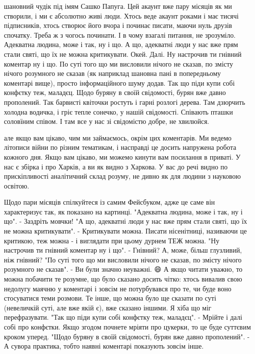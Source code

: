 шановний чудік під імям Сашко Папуга. Цей акаунт вже пару місяців як ми
створили, і ми є абсолютно живі люди. Хтось веде акаунт роками і має тисячі
підписників, хтось створює його вчора і починає писати, маючи нуль друзів
спочатку. Треба ж з чогось починати. І в чому взагалі питання, не зрозуміло.
Адекватна людина, може і так, ну і що. А що, адекватні люди у нас вже прям
стали святі, що їх не можна критикувати. Окей. Далі. Ну настрочив ти гнівний
коментар ну і що. По суті того що ми висловили нічого не сказав, по змісту
нічого розумного не сказав (як наприклад шановна пані в попередньому коментарі
вище), просто інформаційного шуму додав. Так що піди купи собі конфєтку теж,
маладєц. Щодо буряну в своїй свідомості, бурян вже давно прополений. Так
барвисті квіточки ростуть і гарні розлогі дерева. Там дзюрчить холодна водичка,
і гріє тепле сонечко, у нашій свідомості. Співають пташки соловїним співом. І
там все у нас зі свідомістю добре, не хвилюйся.

але якщо вам цікаво, чим ми займаємось, окрім цих коментарів. Ми ведемо
літописи війни по різним тематикам, і насправді це досить напружена робота
кожного дня. Якщо вам цікаво, ми можемо кинути вам посилання в приваті. У нас є
збірка і про Харків, а ви як видно з Харкова. У вас до речі видно по
прискіпливості аналітичний склад розуму, не дивно як для людини з науковою
освітою.

Щодо пари місяців спілкуйтеся із самим Фейсбуком, адже це саме він характеризує
так, як показано на картинці.  "Адекватна людина, може і так, ну і що". -
Заздріть мовчки!  "А що, адекватні люди у нас вже прям стали святі, що їх не
можна критикувати". - Критикувати можна. Писати нісенітниці, називаючи це
критикою, теж можна - і виглядати при цьому дурнем ТЕЖ можна.  "Ну настрочив ти
гнівний коментар ну і що". - Гнівний? А, може, більш глузливий, ніж гнівний?
"По суті того що ми висловили нічого не сказав, по змісту нічого розумного не
сказав". - Ви були значно неуважні. 😄 А якщо читати уважно, то можна побачити
те розумне, що було сказано досить чітко: хтось вивалив свою недолугу маячню у
коментарі і зовсім не потурбувався про те, чи буде воно стосуватися теми
розмови. Те інше, що можна було ще сказати по суті (невеличкій суті, але вже
якій є), вже сказано іншими. Я хіба що міг перефразувати.  "Так що піди купи
собі конфєтку теж, маладєц". - Мрійте і далі собі про конфєтки. Якщо згодом
почнете мріяти про цукерки, то це буде суттєвим кроком уперед.  "Щодо буряну в
своїй свідомості, бурян вже давно прополений". - А сувора практика, тобто
наявні коментарі показують зовсім інше.

